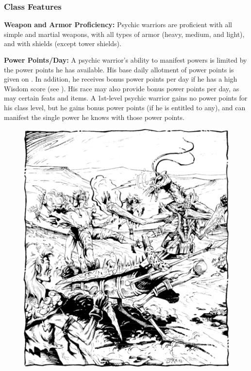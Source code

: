 \subsubsection{Class Features}

\textbf{Weapon and Armor Proficiency:} Psychic warriors are proficient with all simple and martial weapons, with all types of armor (heavy, medium, and light), and with shields (except tower shields).

\textbf{Power Points/Day:} A psychic warrior's ability to manifest powers is limited by the power points he has available. His base daily allotment of power points is given on . In addition, he receives bonus power points per day if he has a high Wisdom score (see ). His race may also provide bonus power points per day, as may certain feats and items. A 1st-level psychic warrior gains no power points for his class level, but he gains bonus power points (if he is entitled to any), and can manifest the single power he knows with those power points.

\begin{figure}[b!]
\centering
\includegraphics[width=\textwidth]{images/psywarrior-1.png}
\WOTC
\end{figure}

